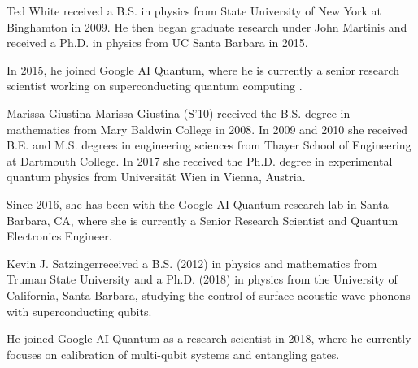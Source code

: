 \documentclass[journal]{IEEEtran}
\begin{document}
\begin{IEEEbiography}{Ted White} received a B.S. in physics from State University of New York at Binghamton in 2009.  He then began graduate research under John Martinis and received a Ph.D. in physics from UC Santa Barbara in 2015.  

In 2015, he joined Google AI Quantum, where he is currently a senior research scientist working on superconducting quantum computing .
\end{IEEEbiography}
\begin{IEEEbiography}{Marissa Giustina} Marissa Giustina (S’10) received the B.S. degree in mathematics from Mary Baldwin College in 2008. In 2009 and 2010 she received B.E. and M.S. degrees in engineering sciences from Thayer School of Engineering at Dartmouth College. In 2017 she received the Ph.D. degree in experimental quantum physics from Universität Wien in Vienna, Austria.

Since 2016, she has been with the Google AI Quantum research lab in Santa Barbara, CA, where she is currently a Senior Research Scientist and Quantum Electronics Engineer.


\end{IEEEbiography}
\begin{IEEEbiography}{Kevin J. Satzinger}received a B.S. (2012) in physics and mathematics from Truman State University and a Ph.D. (2018) in physics from the University of California, Santa Barbara, studying the control of surface acoustic wave phonons with superconducting qubits. 

He joined Google AI Quantum as a research scientist in 2018, where he currently focuses on calibration of multi-qubit systems and entangling gates.


\end{IEEEbiography}
\end{document}

